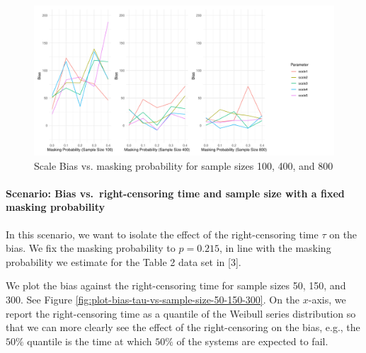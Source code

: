 \documentclass[
]{article}
\begin{document}
\begin{figure}

{\centering \includegraphics{image/plot-bias-scales-p-vs-sample-size-100-400-800} 

}

\caption{Scale Bias vs. masking probability for sample sizes 100, 400, and 800}\label{fig:plot-bias-scales-vs-p-sample-size-100-400-800}
\end{figure}

\hypertarget{scenario-bias-vs.-right-censoring-time-and-sample-size-with-a-fixed-masking-probability}{%
\paragraph*{Scenario: Bias vs.~right-censoring time and sample size with
a fixed masking
probability}\label{scenario-bias-vs.-right-censoring-time-and-sample-size-with-a-fixed-masking-probability}}

In this scenario, we want to isolate the effect of the right-censoring
time \(\tau\) on the bias. We fix the masking probability to
\(p = 0.215\), in line with the masking probability we estimate for the
Table 2 data set in {[}3{]}.

We plot the bias against the right-censoring time for sample sizes 50,
150, and 300. See Figure
\ref{fig:plot-bias-tau-vs-sample-size-50-150-300}. On the \(x\)-axis, we
report the right-censoring time as a quantile of the Weibull series
distribution so that we can more clearly see the effect of the
right-censoring on the bias, e.g., the \(50\%\) quantile is the time at
which \(50\%\) of the systems are expected to fail.
\end{document}
